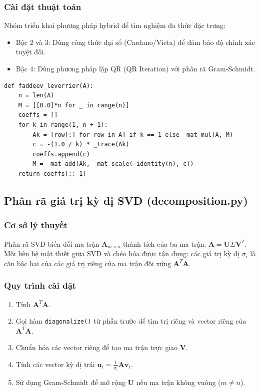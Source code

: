 \documentclass[a4paper,12pt]{article}
\begin{document}
\subsubsection{Cài đặt thuật toán}
Nhóm triển khai phương pháp hybrid để tìm nghiệm đa thức đặc trưng:
\begin{itemize}
    \item Bậc 2 và 3: Dùng công thức đại số (Cardano/Vieta) để đảm bảo độ chính xác tuyệt đối.
    \item Bậc 4: Dùng phương pháp lặp QR (QR Iteration) với phân rã Gram-Schmidt.
\end{itemize}

\begin{lstlisting}[caption={Thuật toán Faddeev--LeVerrier tìm hệ số đa thức đặc trưng}]
def faddeev_leverrier(A):
    n = len(A)
    M = [[0.0]*n for _ in range(n)]
    coeffs = []
    for k in range(1, n + 1):
        Ak = [row[:] for row in A] if k == 1 else _mat_mul(A, M)
        c = -(1.0 / k) * _trace(Ak)
        coeffs.append(c)
        M = _mat_add(Ak, _mat_scale(_identity(n), c))
    return coeffs[::-1]
\end{lstlisting}

\subsection{Phân rã giá trị kỳ dị SVD (decomposition.py)}

\subsubsection{Cơ sở lý thuyết}
Phân rã SVD biến đổi ma trận $\mathbf{A}_{m \times n}$ thành tích của ba ma trận: $\mathbf{A} = \mathbf{U}\Sigma\mathbf{V}^T$. 
Mối liên hệ mật thiết giữa SVD và chéo hóa được tận dụng: các giá trị kỳ dị $\sigma_i$ là căn bậc hai của các giá trị riêng của ma trận đối xứng $\mathbf{A}^T\mathbf{A}$.

\subsubsection{Quy trình cài đặt}
\begin{enumerate}
    \item Tính $\mathbf{A}^T\mathbf{A}$.
    \item Gọi hàm \texttt{diagonalize()} từ phần trước để tìm trị riêng và vector riêng của $\mathbf{A}^T\mathbf{A}$.
    \item Chuẩn hóa các vector riêng để tạo ma trận trực giao $\mathbf{V}$.
    \item Tính các vector kỳ dị trái $\mathbf{u}_i = \frac{1}{\sigma_i}\mathbf{A}\mathbf{v}_i$.
    \item Sử dụng Gram-Schmidt để mở rộng $\mathbf{U}$ nếu ma trận không vuông ($m \neq n$).
\end{enumerate}
\end{document}
